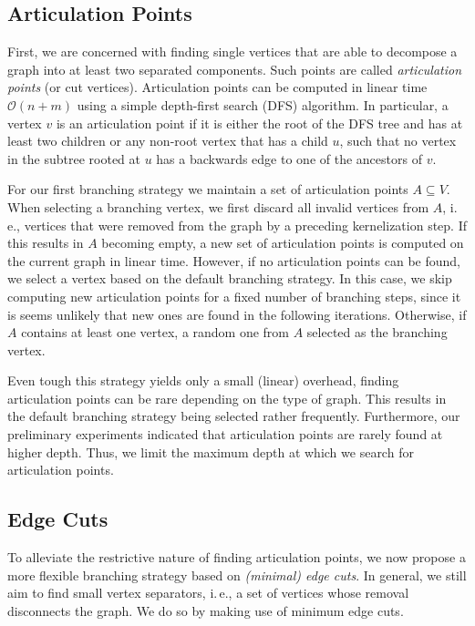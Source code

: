\documentclass[a4paper,UKenglish,cleveref, autoref, thm-restate]{lipics-v2021}
\newcommand{\ie}{i.\,e.,\xspace}
\begin{document}
\subsection{Articulation Points}
First, we are concerned with finding single vertices that are able to decompose a graph into at least two separated components.
Such points are called \emph{articulation points} (or cut vertices).
Articulation points can be computed in linear time $\mathcal{O}(n+m)$ using a simple depth-first search (DFS) algorithm.
In particular, a vertex $v$ is an articulation point if it is either the root of
the DFS tree and has at least two children or any non-root vertex that has a child $u$, such that no vertex in
the subtree rooted at $u$ has a backwards edge to one of the ancestors of
$v$.

For our first branching strategy we maintain a set of articulation points $A \subseteq V$.
When selecting a branching vertex, we first discard all invalid vertices from $A$, \ie vertices that were removed from the graph by a preceding kernelization step.
If this results in $A$ becoming empty, a new set of articulation points is computed on the current graph in linear time.
However, if no articulation points can be found, we select a vertex based on the default branching strategy.
In this case, we skip computing new articulation points for a fixed number of branching steps, since it is seems unlikely that new ones are found in the following iterations.
Otherwise, if $A$ contains at least one vertex, a random one from $A$ selected as the branching
vertex.

Even tough this strategy yields only a small (linear) overhead, finding articulation points can be rare depending on the type of graph.
This results in the default branching strategy being selected rather
frequently.
Furthermore, our preliminary experiments indicated that articulation points are rarely found at higher depth.
Thus, we limit the maximum depth at which we search for articulation points.

\subsection{Edge Cuts}
To alleviate the restrictive nature of finding articulation points, we now propose a more flexible branching strategy based on \emph{(minimal) edge cuts}.
In general, we still aim to find small vertex separators, \ie a set of vertices whose removal disconnects the graph.
We do so by making use of minimum edge cuts.
\end{document}
